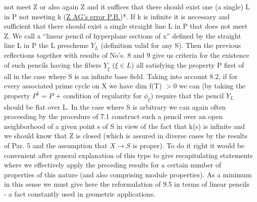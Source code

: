 
not meet Z or also again Z and it suffices that there should exist
one (a single) L in P not meeting k (\uline{Z AG's error P.B.})*. If k is
infinite it is necessary and sufficient that there should exist a
single straight line L in P that does not meet Z. We call a
``linear pencil of hyperplane sections of x'' defined by the
straight line L in P the L prescheme $Y_L$ (definition valid for any
S). Then the previous reflections together with results of No's.
8 and 9 give us criteria for the existence of such pencils having
the fibers $\underline{Y}_\xi$ ($\xi \in L$) all satisfying the property P first of all in
the case where S is an infinite base field. Taking into account
8.2, if for every associated prime cycle on X we have dim f(T) $> 0$
we can (by taking the property $P^1 = P$ + condition of regularity for
$\phi_\xi$) require that the pencil $Y_L$ should be flat over L. In the case
where S is arbitrary we can again often proceeding by the
procedure of 7.1 construct such a pencil over an open neighborhood
of a given point s of S in view of the fact that k(s) is infinite
and we should know that Z is closed (which is assured in diverse
cases by the results of Par. 5 and the assumption that $X \to S$ is
proper). To do it right it would be convenient after general
explanation of this type to give recapitulating statements where
we effectively apply the preceding results for a certain number of
properties of this nature (and also comprising module properties).
As a minimum in this sense we must give here the reformulation of
9.5 in terms of linear pencils - a fact constantly used in
geometric applications.

